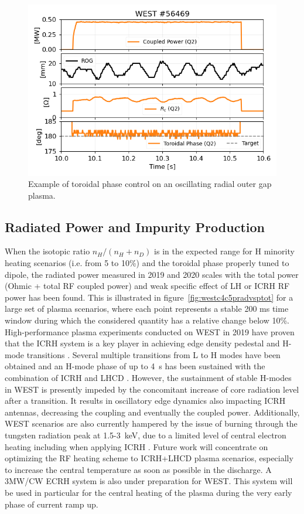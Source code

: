 \documentclass[12p]{iopart}
\begin{document}
\begin{figure}
	\centering
	\includegraphics[width=0.95\linewidth]{figures/WEST_IC_56469_Phase_Control}
	\caption{Example of toroidal phase control on an oscillating radial outer gap plasma.}
	\label{fig:westic56469phasecontrol}
\end{figure}




\subsection{Radiated Power and Impurity Production}
When the isotopic ratio $n_H/(n_H+n_D)$ is in the expected range for H minority heating scenarios (i.e. from 5 to 10\%) and the toroidal phase properly tuned to dipole, the radiated power measured in 2019 and 2020 scales with the total power (Ohmic + total RF coupled power) and weak specific effect of LH or ICRH RF power has been found. This is illustrated in figure~\ref{fig:westc4c5pradvsptot} for a large set of plasma scenarios, where each point represents a stable 200 ms time window during which the considered quantity has a relative change below 10\%. High-performance plasma experiments conducted on WEST in 2019 have proven that the ICRH system is a key player in achieving edge density pedestal and H-mode transitions \cite{goniche2021,vermare2021}. Several multiple transitions from L to H modes have been obtained and an H-mode phase of up to \SI{4}{\second} has been sustained with the combination of ICRH and LHCD \cite{bucalossi2021}. However, the sustainment of stable H-modes in WEST is presently impeded by the concomitant increase of core radiation level after a transition. It results in oscillatory edge dynamics also impacting ICRH antennas, decreasing the coupling and eventually the coupled power. Additionally, WEST scenarios are also currently hampered by the issue of burning through the tungsten radiation peak at 1.5-\SI{3}{\kilo\electronvolt}, due to a limited level of central electron heating including when applying ICRH \cite{goniche2021}. Future work will concentrate on optimizing the RF heating scheme to ICRH+LHCD plasma scenarios, especially to increase the central temperature as soon as possible in the discharge. A 3MW/CW ECRH system is also under preparation for WEST\cite{bucalossi2021}. This system will be used in particular for the central heating of the plasma during the very early phase of current ramp up.
\end{document}
